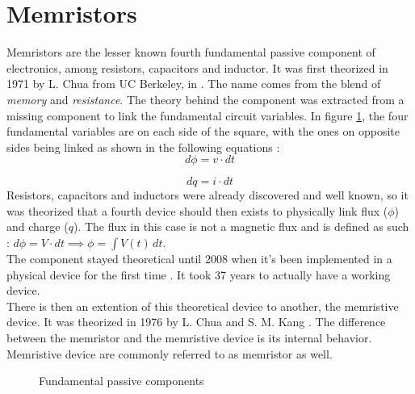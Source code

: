 \section{Memristors}
\label{sec:memristors}

Memristors are the lesser known fourth fundamental passive component of electronics, among resistors, capacitors and inductor.
It was first theorized in 1971 by L. Chua from UC Berkeley, in \cite{TheoMemristor}. The name comes from the blend of \textit{memory} and \textit{resistance}.
The theory behind the component was extracted from a missing component to link the fundamental circuit variables. In figure \ref{fig:fundComp}, the four fundamental variables are on each side of the square, with the ones on opposite sides being linked as shown in the following equations :
\begin{equation}
  d\phi = v\cdot dt
\end{equation}

\begin{equation}
  dq = i\cdot dt
\end{equation}
Resistors, capacitors and inductors were already discovered and well known, so it was theorized that a fourth device should then exists to physically link flux ($\phi$) and charge ($q$).  The flux in this case is not a magnetic flux and is defined as such : $ d\phi=V\cdot dt \implies \phi =  \int V(t) \,dt  $.\\
The component stayed theoretical until 2008 when it's been implemented in a physical device for the first time \cite{Strukov2008}. It took 37 years to actually have a working device.\\
There is then an extention of this theoretical device to another, the memristive device. It was theorized in 1976 by L. Chua and S. M. Kang \cite{memrestiveDev}. The difference between the memristor and the memristive device is its internal behavior. Memristive device are commonly referred to as memristor as well.

\begin{figure}[H]
  \centering
  
  \caption{Fundamental passive components}
  \label{fig:fundComp}
\end{figure}

